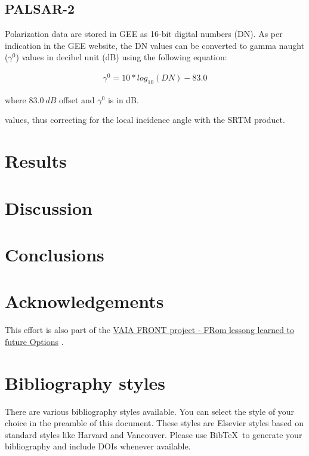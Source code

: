 \documentclass[]{elsarticle} %
\begin{document}
\hypertarget{palsar-2}{%
\subsection{PALSAR-2}\label{palsar-2}}

Polarization data are stored in GEE as 16-bit digital numbers (DN). As
per indication in the GEE website, the DN values can be converted to
gamma naught (\(\gamma^0\)) values in decibel unit (dB) using the
following equation:

\[
\begin{aligned}
 \gamma^0 = 10*log_{10}(DN) - 83.0  
\end{aligned}
\]

where \(83.0 \  dB\) offset and \(\gamma^0\) is in dB.

values, thus correcting for the local incidence angle with the SRTM
product.

\hypertarget{results}{%
\section{Results}\label{results}}

\hypertarget{discussion}{%
\section{Discussion}\label{discussion}}

\hypertarget{conclusions}{%
\section{Conclusions}\label{conclusions}}

\hypertarget{acknowledgements}{%
\section{Acknowledgements}\label{acknowledgements}}

This effort is also part of the
\href{https://www.tesaf.unipd.it/ricerca/progetti-dip-tesaf}{VAIA FRONT
project - FRom lessong learned to future Options} .

\hypertarget{bibliography-styles}{%
\section{Bibliography styles}\label{bibliography-styles}}

There are various bibliography styles available. You can select the
style of your choice in the preamble of this document. These styles are
Elsevier styles based on standard styles like Harvard and Vancouver.
Please use BibTeX~to generate your bibliography and include DOIs
whenever available.
\end{document}

